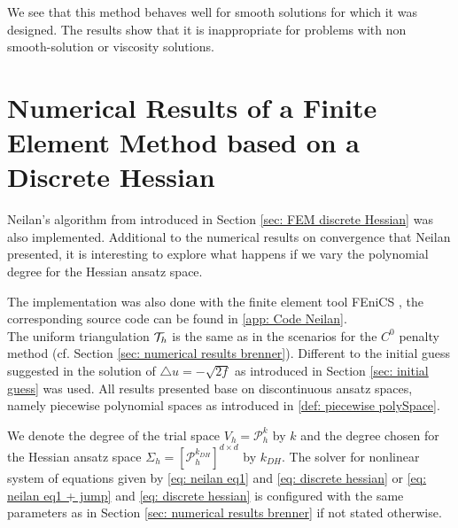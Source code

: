 
We see that this method behaves well for smooth solutions for which it was designed. The results show that it is inappropriate for problems with non smooth-solution or viscosity solutions.

\section{Numerical Results of a Finite Element Method based on a Discrete Hessian}\label{sec: numerical results neilan}

Neilan's algorithm from \cite{Neilan2014} introduced in Section \ref{sec: FEM discrete Hessian} was also implemented.
Additional to the numerical results on convergence that Neilan presented, it is interesting to explore what happens if we vary the polynomial degree for the Hessian ansatz space. 

The implementation was also done with the finite element tool FEniCS \cite{FEniCS}, the corresponding source code can be found in \ref{app: Code Neilan}. \\
The uniform triangulation $\mathcal{T}_h$ is the same as in the scenarios for the $C^0$ penalty method (cf. Section \ref{sec: numerical results brenner}).
Different to the initial guess suggested in \cite{Neilan2014} the solution of $\triangle u = -\sqrt{2f}$ as introduced in Section \ref{sec: initial guess} was used. All results presented base on discontinuous ansatz spaces, namely piecewise polynomial spaces as introduced in \ref{def: piecewise polySpace}.

We denote the degree of the trial space $V_h=\mathcal P_h^k$ by $k$ and the degree chosen for the Hessian ansatz space $\Sigma_h = [\mathcal{P}_h^{k_{DH}}]^{d \times d}$ by $k_{DH}$. The solver for nonlinear system of equations given by \eqref{eq: neilan eq1} and \eqref{eq: discrete hessian} or \eqref{eq: neilan eq1 + jump} and \eqref{eq: discrete hessian} is configured with the same parameters as in Section \ref{sec: numerical results brenner} if not stated otherwise. 









